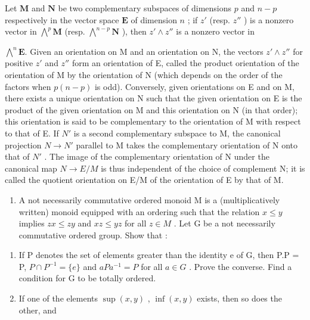 Let \(\mathbf{M}\) and \(\mathbf{N}\) be two complementary subspaces of dimensions \(p\) and \(n - p\) respectively in the vector space \(\mathbf{E}\) of dimension \(n\) ; if \(z'\) (resp. \(z''\) ) is a nonzero vector in \(\bigwedge^{p} \mathbf{M}\) (resp. \(\bigwedge^{n - p} \mathbf{N}\) ), then \(z' \wedge z''\) is a nonzero vector in

\(\bigwedge^{n} \mathbf{E}\). Given an orientation on M and an orientation on N, the vectors \(z' \wedge z''\) for positive \(z'\) and \(z''\) form an orientation of E, called the product orientation of the orientation of M by the orientation of N (which depends on the order of the factors when \(p(n - p)\) is odd). Conversely, given orientations on E and on M, there exists a unique orientation on N such that the given orientation on E is the product of the given orientation on M and this orientation on N (in that order); this orientation is said to be complementary to the orientation of M with respect to that of E. If \(N'\) is a second complementary subspace to M, the canonical projection \(N \to N'\) parallel to M takes the complementary orientation of N onto that of \(N'\) . The image of the complementary orientation of N under the canonical map \(N \to E/M\) is thus independent of the choice of complement N; it is called the quotient orientation on E/M of the orientation of E by that of M.

\BourbakiExercises

\BourbakiExerciseGroup

\begin{enumerate}
\def\labelenumi{\arabic{enumi})}
\tightlist
\item
  A not necessarily commutative ordered monoid M is a (multiplicatively written) monoid equipped with an ordering such that the relation \(x \leqslant y\) implies \(zx \leqslant zy\) and \(xz \leqslant yz\) for all \(z \in M\) . Let G be a not necessarily commutative ordered group. Show that :
\end{enumerate}

\begin{enumerate}
\def\labelenumi{\alph{enumi})}
\item
  If P denotes the set of elements greater than the identity e of G, then P.P = P, \(P \cap P^{-1} = \{e\}\) and \(aPa^{-1} = P\) for all \(a \in G\) . Prove the converse. Find a condition for G to be totally ordered.
\item
  If one of the elements \(\sup (x,y)\) , \(\inf (x,y)\) exists, then so does the other, and
\end{enumerate}

